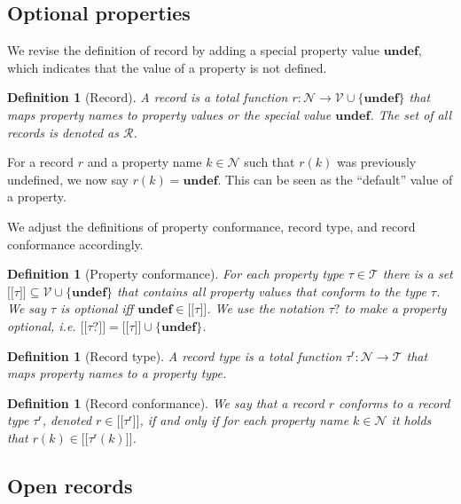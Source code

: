 \documentclass{article}
\newtheorem{definition}[theorem]{Definition}
\newcommand{\ptype}{\tau}
\newcommand{\ptypes}{\mathcal{T}}
\newcommand{\rtype}{\tau^\mathsf{r}}
\newcommand{\lsem}{\ensuremath{[\![}}
\newcommand{\rsem}{\ensuremath{]\!]}}
\newcommand{\sem}[1]{\ensuremath{\lsem #1 \rsem}}
\newcommand{\undefined}{\mathbf{undef}}
\begin{document}
\subsection{Optional properties}

We revise the definition of record by adding a special property value $\undefined$, which indicates that the value of a property is not defined.

\begin{definition}[Record]
  A \emph{record} is a total function $r : \mathcal{N} \to \mathcal{V} \cup \{\undefined\}$ that maps property names to property values or the special value $\undefined$. The set of all records is denoted as $\mathcal{R}$.
\end{definition}

For a record $r$ and a property name $k \in \mathcal{N}$ such that $r(k)$ was previously undefined, we now say $r(k) = \undefined$. This can be seen as the ``default'' value of a property.

We adjust the definitions of property conformance, record type, and record conformance accordingly.

\begin{definition}[Property conformance]
  For each property type $\ptype \in \ptypes$ there is a set $\sem{\ptype} \subseteq \mathcal{V} \cup \{\undefined\}$ that contains all property values that \emph{conform} to the type $\ptype$. We say $\ptype$ is \emph{optional} iff $\undefined \in \sem{\ptype}$. We use the notation $\ptype?$ to make a property optional, i.e. $\sem{\ptype?} = \sem{\ptype} \cup \{ \undefined \}$.
\end{definition}

\begin{definition}[Record type]
  A \emph{record type} is a total function $\rtype : \mathcal{N} \to \ptypes$ that maps property names to a property type.
\end{definition}

\begin{definition}[Record conformance]
  We say that a record $r$ \emph{conforms} to a record type $\rtype$, denoted $r \in \sem{\rtype}$, if and only if for each property name $k \in \mathcal{N}$ it holds that $r(k) \in \sem{\rtype(k)}$.
\end{definition}

\subsection{Open records}
\end{document}
